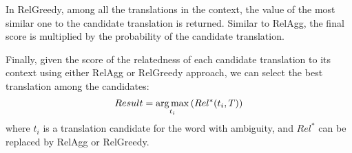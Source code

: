 In RelGreedy, among all the translations in the context, the value of the most similar one to the candidate translation is returned. Similar to RelAgg, the final score is multiplied by the probability of the candidate translation.

Finally, given the score of the relatedness of each candidate translation to its context using either RelAgg or RelGreedy approach, we can select the best translation among the candidates:
\vspace{-0.2cm}
\begin{equation}
  \label{formula:bestrel}
  Result=\argmax_{t_i}\left(Rel^*(t_i,T)\right)
\vspace{-0.2cm}
\end{equation}
where $t_i$ is a translation candidate for the word with ambiguity, and $Rel^*$ can be replaced by RelAgg or RelGreedy.
